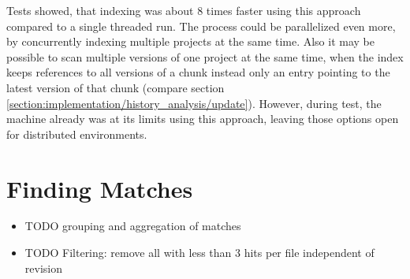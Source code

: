 Tests showed, that indexing was about 8 times faster using this approach compared to a single threaded run.
The process could be parallelized even more, by concurrently indexing multiple projects at the same time.
Also it may be possible to scan multiple versions of one project at the same time, when the index keeps  references to all versions of a chunk instead only an entry pointing to the latest version of that chunk (compare section \ref{section:implementation/history_analysis/update}).
However, during test, the machine already was at its limits using this approach, leaving those options open for distributed environments.

\section{Finding Matches}\label{section:implementation/finding_matches}
\begin{itemize}
	\item TODO grouping and aggregation of matches
	\item TODO Filtering: remove all with less than 3 hits per file independent of revision
\end{itemize}